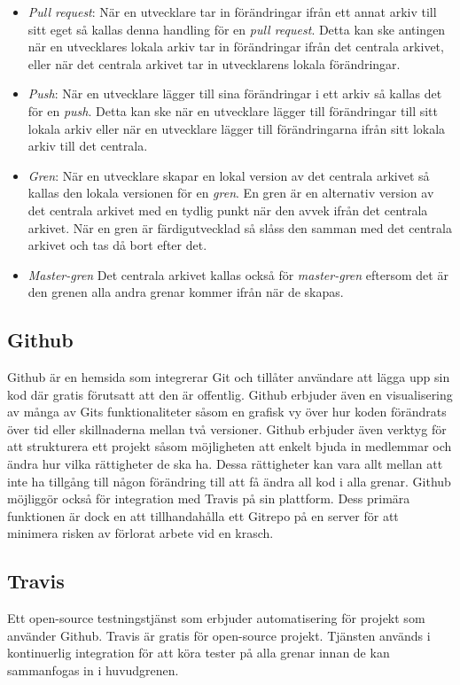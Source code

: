\begin{itemize}
	\item \textit{Pull request}: När en utvecklare tar in förändringar ifrån ett annat arkiv till sitt eget så kallas denna handling för en \textit{pull request}. Detta kan ske antingen när en utvecklares lokala arkiv tar in förändringar ifrån det centrala arkivet, eller när det centrala arkivet tar in utvecklarens lokala förändringar.
	
	\item \textit{Push}: När en utvecklare lägger till sina förändringar i ett arkiv så kallas det för en \textit{push}. Detta kan ske när en utvecklare lägger till förändringar till sitt lokala arkiv eller när en utvecklare lägger till förändringarna ifrån sitt lokala arkiv till det centrala.
	
	\item \textit{Gren}: När en utvecklare skapar en lokal version av det centrala arkivet så kallas den lokala versionen för en \textit{gren}. En gren är en alternativ version av det centrala arkivet med en tydlig punkt när den avvek ifrån det centrala arkivet. När en gren är färdigutvecklad så slåss den samman med det centrala arkivet och tas då bort efter det.
	
	\item \textit{Master-gren} Det centrala arkivet kallas också för \textit{master-gren} eftersom det är den grenen alla andra grenar kommer ifrån när de skapas.
\end{itemize}


\subsection*{Github}
Github är en hemsida som integrerar Git och tillåter användare att lägga upp sin kod där gratis förutsatt att den är offentlig. Github erbjuder även en visualisering av många av Gits funktionaliteter såsom en grafisk vy över hur koden förändrats över tid eller skillnaderna mellan två versioner. Github erbjuder även verktyg för att strukturera ett projekt såsom möjligheten att enkelt bjuda in medlemmar och ändra hur vilka rättigheter de ska ha. Dessa rättigheter kan vara allt mellan att inte ha tillgång till någon förändring till att få ändra all kod i alla grenar. Github möjliggör också för integration med Travis på sin plattform. Dess primära funktionen är dock en att tillhandahålla ett Gitrepo på en server för att minimera risken av förlorat arbete vid en krasch.

\subsection*{Travis}
Ett open-source testningstjänst som erbjuder automatisering för projekt som använder Github. Travis är gratis för open-source projekt. Tjänsten används i kontinuerlig integration för att köra tester på alla grenar innan de kan sammanfogas in i huvudgrenen\cite{Travis}.

